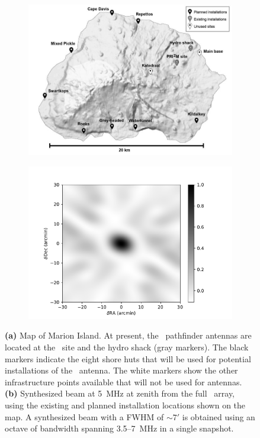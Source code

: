 \begin{figure}
	\centering
	\begin{subfigure}[t]{0.5\textwidth}
		\centering
		\includegraphics[width=\linewidth]{Figures/marion_map_annotated.jpg} 
		\caption{} \label{Fig:marion_map}
	\end{subfigure}
	\hfill
	\begin{subfigure}[t]{0.49\textwidth}
		\centering
		\includegraphics[width=\linewidth]{Figures/marion_beam_huts_2020}
		\caption{} \label{Fig:marion_beam}
	\end{subfigure}
	\caption{{\bf (a)} Map of Marion Island.  At present, the \albatros\ pathfinder antennas are located at the \prizm\ site and the hydro shack (gray markers). The black markers indicate the eight shore huts that will be used for potential installations of the \albatros\ antenna.  The white markers show the other infrastructure points available that will not be used for antennas. {\bf (b)} Synthesized beam at 5~MHz at zenith from the full \albatros\ array, using the existing and planned
		installation locations shown on the map.  A synthesized beam with a FWHM of $\sim7'$ is obtained using an octave of bandwidth spanning 3.5--7~MHz in a single snapshot.}
	\label{Fig:marion_map_beam}
\end{figure}

